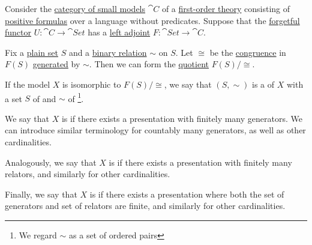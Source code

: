 \begin{definition}\label{def:object_presentation}\mimprovised
  Consider the \hyperref[def:category_of_small_first_order_models]{category of small models} \( \cat{C} \) of a \hyperref[def:first_order_theory]{first-order theory} consisting of \hyperref[def:positive_formula]{positive formulas} over a language without predicates. Suppose that the \hyperref[def:concrete_category]{forgetful functor} \( U: \cat{C} \to \cat{Set} \) has a \hyperref[def:category_adjunction]{left adjoint} \( F: \cat{Set} \to \cat{C} \).

  Fix a \hyperref[def:set]{plain set} \( S \) and a \hyperref[def:binary_relation]{binary relation} \( {\sim} \) on \( S \). Let \( {\cong} \) be the \hyperref[def:first_order_congruence]{congruence} in \( F(S) \) \hyperref[def:first_order_generated_congruence]{generated} by \( {\sim} \). Then we can form the \hyperref[def:first_order_quotient]{quotient} \( F(S) / {\cong} \).

  If the model \( X \) is isomorphic to \( F(S) / {\cong} \), we say that \( (S, {\sim}) \) is a  of \( X \) with a set \( S \) of  and \( {\sim} \) of \footnote{We regard \( {\sim} \) as a set of ordered pairs}.

  \begin{thmenum}
     We say that \( X \) is  if there exists a presentation with finitely many generators. We can introduce similar terminology for countably many generators, as well as other cardinalities.

     Analogously, we say that \( X \) is  if there exists a presentation with finitely many relators, and similarly for other cardinalities.

     Finally, we say that \( X \) is  if there exists a presentation where both the set of generators and set of relators are finite, and similarly for other cardinalities.
  \end{thmenum}
\end{definition}

